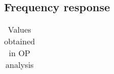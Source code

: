 \subsection{Frequency response}



\begin{table}[H]
  \centering
  \begin{tabular}{|c|c|}
    \hline
      
  \end{tabular}
  \caption{Values obtained in OP analysis}
  \label{tab:resultsDC1}
\end{table}




